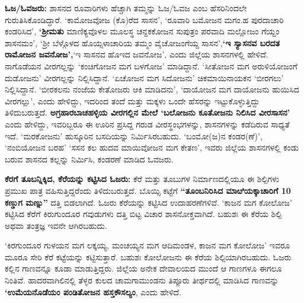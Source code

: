 \textbf{ಓಜ/ಓವಜರು:} ಶಾಸನದ ರೂವಾರಿಗಳು ಹೆಚ್ಚಾಗಿ ತಮ್ಮನ್ನು ಓಜ/ಓವಜ ಎಂಬ ಹೆಸರಿನಿಂದಲೇ ಗುರುತಿಸಿ\-ಕೊಂಡಿದ್ದಾರೆ. ‘ಕಾಮೋಜವೋಜ (ಕೊ)ರೆದ ಸಾಸನ’, ‘ರೂವಾರಿ ಬಮೋಜನ ಮಗಂ.ಹ ಪುರದಾಚಾರಿ ಕಂಡರಿಸಿದ’,\- \textbf{‘ಶ‍್ರೀಮತು }ಮಾಣಿಕ್ಯವೊಳಲ ಮೂಲಸ್ಥ ಚನ್ದಕಕೋಜನ ಸುಪುತ್ರಂ ಪರವಾದಿ ಮಲ್ಲೋಜಂ ಗೆಯ್ದಂ ಶಾಸನಮಂ’, ‘ಶ‍್ರೀ ಬೆಳ್ಗೊಳದ ಹೊಯ್ಸಳಾಚಾರಿಯ ತಮ್ಮಂ ವೈಚೋಜಂಗೆಯ್ದ ಸಾಸನ’,\textbf{‘ಇ ಸ್ಯಾಸನವ ಬರದತ ರಾಮೋಜನ ಜವನೋಜ’,}‘ಇ ಸಾಸನವ ಹೊಇದ ಜವನೋಜ’, ಎಂದು ಜಿಲ್ಲೆಯ ಶಾಸನಗಳಲ್ಲಿ ಹೇಳಿದೆ. ನಾಗೊಡೆಯನ ವೀರಗಲ್ಲನ್ನು ‘ಕಂಚಿಗೋಜನ ಮಗ ಬಳಗೋಜ’ ಮಾಡಿದ್ದಾನೆ. ‘ಸೀತೋಜನ ಮಗ ಅರುಳಿಯೋಜಂಗೆ ದುಡೋಜನು’ ವೀರಗಲ್ಲನ್ನು ನಿಲ್ಲಿಸಿದ್ದಾನೆ. ‘ಏಚೋಜನ ಮಗ ಸಿದೋಜನು’ ಚಿಕಮಾಯಿನಾಯಕನ ‘ಬೀರಗಲು’ ನಿಲ್ಲಿಸಿದ್ದಾನೆ. ‘ಬೀರಕಲನು ನಂಜೆಯ ಕೇತೋಜರು ಆಕಿ ಮಾಡಿದನು’, ‘ದಾಯೋಜನ ಮಗ ದಾಯೋಜನು ಹುಯಿಸಿದ ವೀರಗಲ್ಲು’, ಎಂದು ಹೇಳಿದ್ದು, ಇದರಿಂದ ತಂದೆ ಮತ್ತು ಮಕ್ಕಳು ಒಂದೇ ಹೆಸರನ್ನು ಇಟ್ಟುಕೊಳ್ಳುತ್ತಿದ್ದು ತಿಳಿದುಬರುತ್ತದೆ. \textbf{ಅಗ್ರಹಾರ\-ಬಾಚಹಳ್ಳಿಯ ವೀರಗಲ್ಲಿನ ಮೇಲೆ ‘ಬಲೋಜನು ಕೂತೋಜನು ನಿಲಿಸಿದ ವೀರಸಾಸನ’} ಎಂದು ಹೇಳಿದ್ದು, ಇವರಿಬ್ಬರೂ ಈ ಊರಿನ ಪ್ರಸಿದ್ದ ಗರುಡ ವೀರಸ್ಥಂಭಗಳನ್ನು, ಶಾಸನಗಳನ್ನು ಕಡೆದಿರುವ ಸಾಧ್ಯತೆ ಇದೆ. ‘ಮರಕೋಜನು’ ಹುಸ್ಕೂರಿನ ಬಸದಿಯನ್ನು ನಿರ್ಮಿಸಿರಬಹುದು. ‘ಬಂಮೋ(ಜ)ನ ಕಂಡರ(ಣೆ)’, ‘ನಂಬಿಯೋಜನ ಬರಹ’ ‘ಸಸನ ಕಲ ಹುದವ ಮಾಯಿವೋಜನ ಮಗ ಕೇತಣ’, ಇವರು ಜಿಲ್ಲೆಯ ಶಾಸನಗಳಲ್ಲಿ ಕಂಡು ಬರುವ ಶಾಸನದ ಕಲ್ಲನ್ನು ನಿರ್ಮಿಸಿ, ಕಂಡರಣೆ ಮಾಡಿದ ಓವಜರು.

\vskip 3pt

\textbf{ಕೆರಗೆ ತೂಬನ್ನಿಕ್ಕಿದ, ಕೆರೆಯನ್ನು ಕಟ್ಟಿಸಿದ ಓಜರು: } ಕೆರೆ ಮತ್ತು ತೂಬುಗಳ ನಿರ್ಮಾಣದಲ್ಲಿಯೂ ಈ ಶಿಲ್ಪಿಗಳು ಪ್ರಮುಖ ಪಾತ್ರ ವಹಿಸುತ್ತಿದ್ದರೆಂದು ತಿಳಿದುಬರುತ್ತದೆ. ಬೊಯ್ಸಿ ಕಟ್ಟೆಗೆ \textbf{“ತೂಂಬನಿರಿಸಿದ ಮಾೞಿಯಕ್ಕಾಚಾರಿಗೆ 10 ಕಣ್ಡುಗ ಮಣ್ನು”} ದತ್ತಿ ಬಿಡಲಾಗಿದೆ. ಓಜರು ಕೆರೆಯನ್ನು ಕಟ್ಟಿಸಿದ ಉದಾಹರಣೆಗಳಿವೆ. ‘ಕಾಜನ ಮಗ ಕೋಲೋಜ’ ಕಟ್ಟಿಸಿದ ಕೆರೆಗೆ ಕಿರುಗುಂದೂರ ಗವುಡುಗಳು ದತ್ತಿ ಬಿಟ್ಟ ವಿಚಾರ ಶಾಸನೋಕ್ತವಾಗಿದೆ. ಬಹುಶಃ ಈ ಕೆರೆಯ ಶಿಲ್ಪಿ ಅಥವಾ ತಂತ್ರಜ್ಞ ಇವನೇ ಆಗಿರಬಹುದು.

‘ಕಿರಗುಂದೂರ ಗುಳಯನ ಮಗ ಲಕ್ಕಯ್ಯ, ಮಂಚಯ್ಯನ ಮಗ ಆದಿಮಂಡಳ, ಕಾಜನ ಮಗ ಕೋಲೋಜ’ ಇವರೂ ಮೂರೂ ಸೇರಿ ಕೆರೆ ಕಟ್ಟೆಯನ್ನು ಕಟ್ಟಿಸುತ್ತಾರೆ. ಬಹುಶಃ ಕೋಲೋಜನು ಈ ಕೆರೆಯ ಶಿಲ್ಪಿಯಾಗಿರಬಹುದು. ಓಜರು ಕಲ್ಲಿನ ಗಾಣವನ್ನೂ ಕೂಡಾ ಮಾಡುತ್ತಿದ್ದರು. ಜಿಲ್ಲೆಯ ಅನೇಕ ದೇವಾಲಯದ ಮುಂದೆ ಆ ಗಾಣಗಳೂ ಈಗಲೂ ನಿಂತಿವೆ. ಹಾದರವಾಗಿಲಿನಲ್ಲಿ ತೆಳ್ಳರ ಕುಲದ ಚಾಮಗಾಮುಂಡನು ತಿಪ್ಪೂರು ತೀರ್ಥದಲ್ಲಿ ಮಾಡಿಸಿದ ಗಾಣವನ್ನು \textbf{‘ಉಮೆಯನೊಡೆಯಂ ಪಂಡಿತೋಜನ ಹಸ್ತಕೌಸಲ್ಯಂ}, ಎಂದು ಹೇಳಿದೆ.

